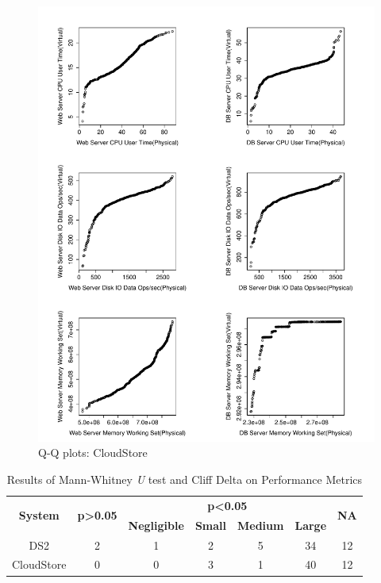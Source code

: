 \begin{figure}[thb]
	\centering
	\includegraphics[width=0.9\columnwidth]{figures/qqplots_CS.pdf}
	\caption{Q-Q plots: CloudStore}
	\label{fig:Results Table}
\end{figure}


\begin{table}[]
	\centering
	\caption{Results of Mann-Whitney \textit{U} test and Cliff Delta on Performance Metrics}
	\label{my-label}
	\begin{tabular}{|c|c|c|c|c|c|l|}
		\hline
		\multirow{2}{*}{\textbf{System}} & \multirow{2}{*}{\textbf{p\textgreater0.05}} & \multicolumn{4}{c|}{\textbf{p\textless0.05}} & \multirow{2}{*}{\textbf{NA}} \\ \cline{3-6}
		&  & \multicolumn{1}{l|}{\textbf{Negligible}} & \multicolumn{1}{l|}{\textbf{Small}} & \textbf{Medium} & \textbf{Large} &  \\ \hline
		DS2 & 2 & 1 & 2 & 5 & 34 & \multicolumn{1}{c|}{12} \\ \hline
		CloudStore & 0 & 0 & 3 & 1 & 40 & \multicolumn{1}{c|}{12} \\ \hline
	\end{tabular}
\end{table}


